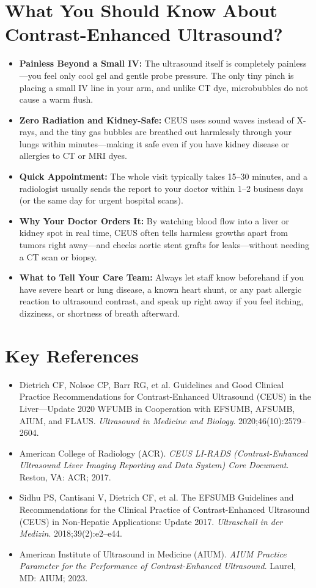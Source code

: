 \section{What You Should Know About Contrast-Enhanced Ultrasound?}

\begin{itemize}
    \item \textbf{Painless Beyond a Small IV:} The ultrasound itself is completely painless---you feel only cool gel and gentle probe pressure. The only tiny pinch is placing a small IV line in your arm, and unlike CT dye, microbubbles do not cause a warm flush.
    \item \textbf{Zero Radiation and Kidney-Safe:} CEUS uses sound waves instead of X-rays, and the tiny gas bubbles are breathed out harmlessly through your lungs within minutes---making it safe even if you have kidney disease or allergies to CT or MRI dyes.
    \item \textbf{Quick Appointment:} The whole visit typically takes 15--30 minutes, and a radiologist usually sends the report to your doctor within 1--2 business days (or the same day for urgent hospital scans).
    \item \textbf{Why Your Doctor Orders It:} By watching blood flow into a liver or kidney spot in real time, CEUS often tells harmless growths apart from tumors right away---and checks aortic stent grafts for leaks---without needing a CT scan or biopsy.
    \item \textbf{What to Tell Your Care Team:} Always let staff know beforehand if you have severe heart or lung disease, a known heart shunt, or any past allergic reaction to ultrasound contrast, and speak up right away if you feel itching, dizziness, or shortness of breath afterward.
\end{itemize}

\section{Key References}

\begin{itemize}
    \item Dietrich CF, Nolsoe CP, Barr RG, et al. Guidelines and Good Clinical Practice Recommendations for Contrast-Enhanced Ultrasound (CEUS) in the Liver---Update 2020 WFUMB in Cooperation with EFSUMB, AFSUMB, AIUM, and FLAUS. \textit{Ultrasound in Medicine and Biology}. 2020;46(10):2579--2604.
    \item American College of Radiology (ACR). \textit{CEUS LI-RADS (Contrast-Enhanced Ultrasound Liver Imaging Reporting and Data System) Core Document}. Reston, VA: ACR; 2017.
    \item Sidhu PS, Cantisani V, Dietrich CF, et al. The EFSUMB Guidelines and Recommendations for the Clinical Practice of Contrast-Enhanced Ultrasound (CEUS) in Non-Hepatic Applications: Update 2017. \textit{Ultraschall in der Medizin}. 2018;39(2):e2--e44.
    \item American Institute of Ultrasound in Medicine (AIUM). \textit{AIUM Practice Parameter for the Performance of Contrast-Enhanced Ultrasound}. Laurel, MD: AIUM; 2023.
\end{itemize}
